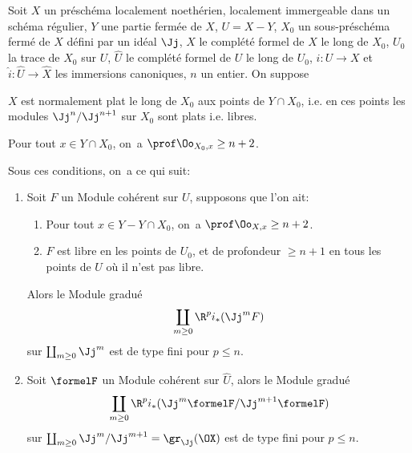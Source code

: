\begin{theoreme} \label{XII.4.1} Soit $X$ un pr\'esch\'ema localement noeth\'erien, localement immergeable dans un sch\'ema r\'egulier, $Y$ une partie ferm\'ee de $X$, $U=X- Y$, $X_0$ un sous-pr\'esch\'ema ferm\'e de $X$ d\'efini par un id\'eal $\Jj$, $\widehat{X}$ le compl\'et\'e formel de $X$ le long de $X_0$, $U_0$ la trace de $X_0$ sur $U$, $\widehat{U}$ le compl\'et\'e formel de $U$ le long de $U_0$, $i:U\to X$ et $\widehat{i}:\widehat{U}\to \widehat{X}$ les immersions canoniques, $n$ un entier. On suppose
\begin{enumeratea}
\item
$X$ est normalement plat le long de $X_0$ aux points de $Y\cap X_0$, i.e. en ces points les modules $\Jj^n/\Jj^{n+1}$ sur $X_0$ sont plats i.e. \ignorespaces libres.
\item
Pour tout $x\in Y\cap X_0$, on~a $\prof \Oo_{X_0, x}\geq n+2$.
\end{enumeratea}
Sous ces conditions, on~a ce qui suit:
\begin{enumerate}
\item[$1^\circ)$] Soit $F$ un Module coh\'erent sur $U$, supposons que l'on ait:
\begin{enumerate}
\item[\textup{c)}] Pour tout $x\in Y- Y\cap X_0$, on~a $\prof \Oo_{X, x}\geq n+2$.

\item[\textup{d)}] $F$ est libre en les points de $U_0$, et de profondeur $\geq n+1$ en tous les points de $U$ o\`u il n'est pas libre.
\end{enumerate}
Alors le Module gradu\'e
\[
\coprod_{m\geq 0}\R^pi_\ast(\Jj^mF)
\]
sur $\coprod_{m\geq 0}\Jj^m$ est de type fini pour $p\leq n$. \item[$2^\circ$] Soit $\formelF$ un Module coh\'erent sur $\widehat{U}$, alors le Module gradu\'e
\[
\coprod_{m\geq 0}\R^pi_\ast(\Jj^m\formelF/\Jj^{m+1}\formelF)
\]
sur $\coprod_{m\geq 0}\Jj^m/\Jj^{m+1}=\gr_{\Jj}(\OX)$ est de type fini pour $p\leq n$.
\end{enumerate}
\end{theoreme}

